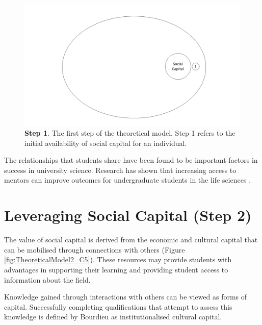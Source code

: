 \begin{figure}[h!]
\centering
\includegraphics[width=\textwidth]{C5 - Understanding Capital Accumulation/HabitusSocCap_TheoreticalModel1.png}
\caption{\label{fig:TheoreticalModel1_C5}\textbf{Step 1}. The first step of the theoretical model. Step 1 refers to the initial availability of social capital for an individual.}
\end{figure}

The relationships that students share have been found to be important factors in success in university science. Research has shown that increasing access to mentors can improve outcomes for undergraduate students in the life sciences \citep{aikens2016social}. 


\section{Leveraging Social Capital (Step 2)}
The value of social capital is derived from the economic and cultural capital that can be mobilised through connections with others (Figure \ref{fig:TheoreticalModel2_C5}). These resources may provide students with advantages in supporting their learning and providing student access to information about the field. 

Knowledge gained through interactions with others can be viewed as forms of capital. Successfully completing qualifications that attempt to assess this knowledge is defined by Bourdieu as institutionalised cultural capital. 

